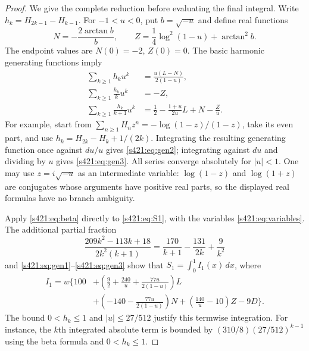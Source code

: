 \documentclass[11pt,a4paper]{article}
\theoremstyle{remark}\newtheorem{remark}[theorem]{Remark}
\numberwithin{equation}{section}
\begin{document}
\begin{proof}
We give the complete reduction before evaluating the final integral. Write $h_k=H_{2k-1}-H_{k-1}$. For $-1<u<0$, put $b=\sqrt{-u}$ and define real functions
\[
 N=-\frac{2\arctan b}{b},\qquad
 Z=\frac14\log^2(1-u)+\arctan^2 b.
\]
The endpoint values are $N(0)=-2$, $Z(0)=0$. The basic harmonic generating functions imply
\begin{align}
 \sum_{k\ge1}h_ku^k&=\frac{u(L-N)}{2(1-u)},\label{s421:eq:gen1}\\
 \sum_{k\ge1}\frac{h_k}{k}u^k&=-Z,\label{s421:eq:gen2}\\
 \sum_{k\ge1}\frac{h_k}{k+1}u^k
 &=\frac12-\frac{1+u}{2u}L+N-\frac Zu.\label{s421:eq:gen3}
\end{align}
For example, start from $\sum_{n\ge1}H_nz^n=-\log(1-z)/(1-z)$, take its even part, and use
$h_k=H_{2k}-H_k+1/(2k)$. Integrating the resulting generating function once against $du/u$ gives \eqref{s421:eq:gen2}; integrating against $du$ and dividing by $u$ gives \eqref{s421:eq:gen3}. All series converge absolutely for $|u|<1$. One may use $z=i\sqrt{-u}$ as an intermediate variable: $\log(1-z)$ and $\log(1+z)$ are conjugates whose arguments have positive real parts, so the displayed real formulas have no branch ambiguity.

Apply \eqref{s421:eq:beta} directly to \eqref{s421:eq:S1}, with the variables \eqref{s421:eq:variables}. The additional partial fraction
\[
 \frac{209k^2-113k+18}{2k^2(k+1)}
 =\frac{170}{k+1}-\frac{131}{2k}+\frac9{k^2}
\]
and \eqref{s421:eq:gen1}--\eqref{s421:eq:gen3} show that $S_1=\int_0^1I_1(x)\,dx$, where
\begin{equation}\label{s421:eq:I1}
 \begin{split}
 I_1=w\bigg\{100
  &+\left(\frac92+\frac{240}{u}+\frac{77u}{2(1-u)}\right)L\\
  &+\left(-140-\frac{77u}{2(1-u)}\right)N
    +\left(\frac{140}{u}-10\right)Z-9D\bigg\}.
 \end{split}
\end{equation}
The bound $0<h_k\le1$ and $|u|\le27/512$ justify this termwise integration. For instance, the $k$th integrated absolute term is bounded by $(310/8)(27/512)^{k-1}$ using the beta formula and $0<h_k\le1$.


\end{proof}
\end{document}
